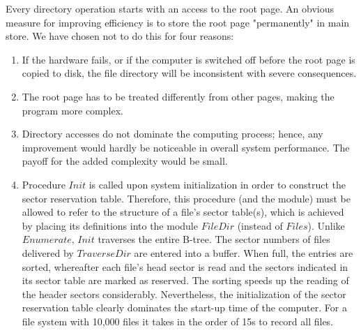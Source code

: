 Every directory operation starts with an access to the root page. An obvious measure for
improving efficiency is to store the root page "permanently" in main store. We have chosen not to
do this for four reasons:
\begin{enumerate}
	\item If the hardware fails, or if the computer is switched off before the root page is copied to disk,
the file directory will be inconsistent with severe consequences.
	\item The root page has to be treated differently from other pages, making the program more
complex.
	\item Directory accesses do not dominate the computing process; hence, any improvement would
hardly be noticeable in overall system performance. The payoff for the added complexity would
be small.
	\item Procedure $Init$ is called upon system initialization in order to construct the sector reservation
table. Therefore, this procedure (and the module) must be allowed to refer to the structure of a
file's sector table(s), which is achieved by placing its definitions into the module $FileDir$ (instead of
$Files$). Unlike $Enumerate$, $Init$ traverses the entire B-tree. The sector numbers of files delivered by
$TraverseDir$ are entered into a buffer. When full, the entries are sorted, whereafter each file's
head sector is read and the sectors indicated in its sector table are marked as reserved. The
sorting speeds up the reading of the header sectors considerably. Nevertheless, the initialization
of the sector reservation table clearly dominates the start-up time of the computer. For a file
system with 10,000 files it takes in the order of 15s to record all files.
\end{enumerate}
